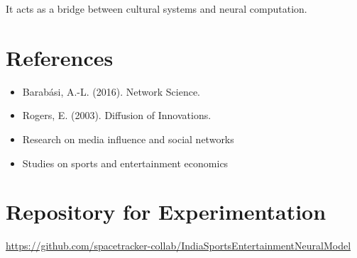 \documentclass[12pt]{article}
\begin{document}
It acts as a bridge between cultural systems and neural computation.

\section{References}

\begin{itemize}
\item Barabási, A.-L. (2016). Network Science.
\item Rogers, E. (2003). Diffusion of Innovations.
\item Research on media influence and social networks
\item Studies on sports and entertainment economics
\end{itemize}

\section{Repository for Experimentation}

\noindent
\url{https://github.com/spacetracker-collab/IndiaSportsEntertainmentNeuralModel}
\end{document}
